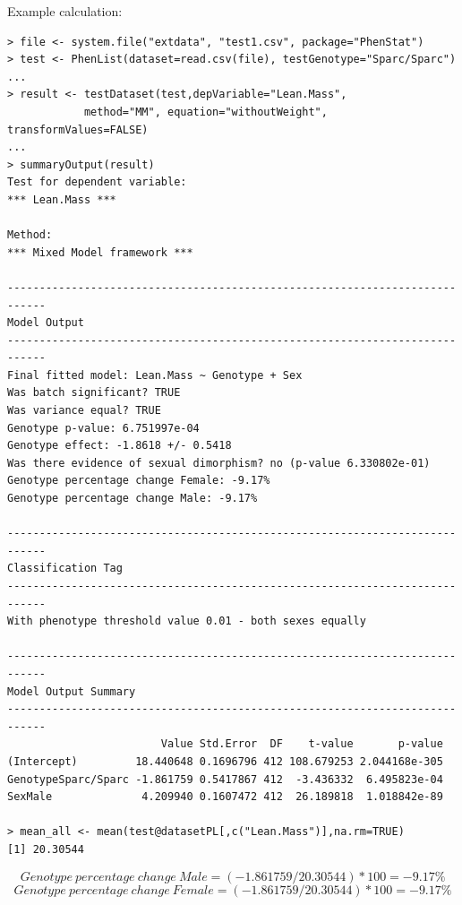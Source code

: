 \documentclass[12pt,a4paper]{article}
\begin{document}
Example calculation:
\begingroup
\fontsize{8pt}{12pt}\selectfont
\begin{verbatim}
> file <- system.file("extdata", "test1.csv", package="PhenStat")
> test <- PhenList(dataset=read.csv(file), testGenotype="Sparc/Sparc")
...
> result <- testDataset(test,depVariable="Lean.Mass", 
			method="MM", equation="withoutWeight", transformValues=FALSE)
...			
> summaryOutput(result)
Test for dependent variable:
*** Lean.Mass ***

Method:
*** Mixed Model framework ***

----------------------------------------------------------------------------
Model Output
----------------------------------------------------------------------------
Final fitted model: Lean.Mass ~ Genotype + Sex
Was batch significant? TRUE
Was variance equal? TRUE
Genotype p-value: 6.751997e-04
Genotype effect: -1.8618 +/- 0.5418
Was there evidence of sexual dimorphism? no (p-value 6.330802e-01)
Genotype percentage change Female: -9.17%
Genotype percentage change Male: -9.17%

----------------------------------------------------------------------------
Classification Tag
----------------------------------------------------------------------------
With phenotype threshold value 0.01 - both sexes equally

----------------------------------------------------------------------------
Model Output Summary
----------------------------------------------------------------------------
                        Value Std.Error  DF    t-value       p-value
(Intercept)         18.440648 0.1696796 412 108.679253 2.044168e-305
GenotypeSparc/Sparc -1.861759 0.5417867 412  -3.436332  6.495823e-04
SexMale              4.209940 0.1607472 412  26.189818  1.018842e-89

> mean_all <- mean(test@datasetPL[,c("Lean.Mass")],na.rm=TRUE)  
[1] 20.30544

\end{verbatim}
\endgroup 
\[
Genotype\:percentage\:change\:Male = (-1.861759/20.30544)*100=-9.17\%
\]
\[
Genotype\:percentage\:change\:Female = (-1.861759/20.30544)*100=-9.17\%
\]
\end{document}
